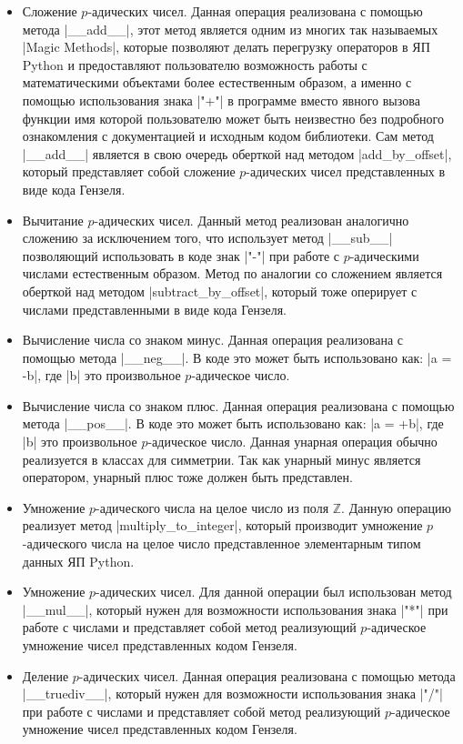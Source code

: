 \documentclass[master, och, diploma, times]{sty/SCWorks}
\theoremstyle{plain}
\theoremstyle{definition}
\numberwithin{equation}{section}
\begin{document}
\begin{itemize}
\item Сложение $p$-адических чисел. Данная операция реализована с помощью метода |__add__|, этот метод является одним из многих так называемых |Magic Methods|, которые позволяют делать перегрузку операторов в ЯП Python и предоставляют пользователю возможность работы с математическими объектами более естественным образом, а именно с помощью использования знака |"+"| в программе вместо явного вызова функции имя которой пользователю может быть неизвестно без подробного ознакомления с документацией и исходным кодом библиотеки. Сам метод |__add__| является в свою очередь оберткой над методом |add_by_offset|, который представляет собой сложение $p$-адических чисел представленных в виде кода Гензеля.
\item Вычитание $p$-адических чисел. Данный метод реализован аналогично сложению за исключением того, что использует метод |__sub__| позволяющий использовать в коде знак |"-"| при работе с $p$-адическими числами естественным образом. Метод по аналогии со сложением является оберткой над методом |subtract_by_offset|, который тоже оперирует с числами представленными в виде кода Гензеля.
\item Вычисление числа со знаком минус. Данная операция реализована с помощью метода |__neg__|. В коде это может быть использовано как: |a = -b|, где |b| это произвольное $p$-адическое число.
\item Вычисление числа со знаком плюс. Данная операция реализована с помощью метода |__pos__|. В коде это может быть использовано как: |a = +b|, где |b| это произвольное $p$-адическое число. Данная унарная операция обычно реализуется в классах для симметрии. Так как унарный минус является оператором, унарный плюс тоже должен быть представлен.
\item Умножение $p$-адического числа на целое число из поля $\mathbb{Z}$. Данную операцию реализует метод |multiply_to_integer|, который производит умножение $p$-адического числа на целое число представленное элементарным типом данных ЯП Python.
\item Умножение $p$-адических чисел. Для данной операции был использован метод |__mul__|, который нужен для возможности использования знака |"*"| при работе с числами и представляет собой метод реализующий $p$-адическое умножение чисел представленных кодом Гензеля.
\item Деление $p$-адических чисел. Данная операция реализована с помощью метода |__truediv__|, который нужен для возможности использования знака |"/"| при работе с числами и представляет собой метод реализующий $p$-адическое умножение чисел представленных кодом Гензеля.

\end{itemize}
\end{document}
